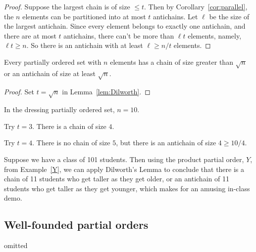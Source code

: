\begin{proof}
Suppose the largest chain is of size $\le t$.  Then by
Corollary~\ref{cor:parallel}, the $n$ elements can be partitioned into
at most $t$ antichains.  Let $\ell$ be the size of the largest
antichain.  Since every element belongs to exactly one antichain, and
there are at most $t$ antichains, there can't be more than $\ell t$
elements, namely, $\ell t \geq n$.  So there is an antichain with at
least $\ell \geq n / t$ elements.
\end{proof}

\begin{corollary}\label{cor:Dilworth}
Every partially ordered set with $n$ elements has a chain of size greater
than $\sqrt{n}$ or an antichain of size at least $\sqrt{n}$.

\begin{proof}
  Set $t = \sqrt{n}$ in Lemma~\ref{lem:Dilworth}.
\end{proof}
\end{corollary}

\begin{example}
In the dressing partially ordered set, $n = 10$.

Try $t = 3$.  There is a chain of size $4$.

Try $t = 4$.  There is no chain of size $5$, but there is an antichain of
size $4 \geq 10 / 4$.
\end{example}

\begin{example}
Suppose we have a class of 101 students.  Then using the product partial
order, $Y$, from Example~\ref{Y}, we can apply Dilworth's Lemma to
conclude that there is a chain of 11 students who get taller as they get
older, or an antichain of 11 students who get taller as they get younger,
which makes for an amusing in-class demo.
\end{example}

\begin{problems}
\practiceproblems
{}
{}

\classproblems
{}

\homeworkproblems
{}
\end{problems}

\begin{staffnotes}
\chapter*{Well-founded partial orders}
omitted
\end{staffnotes}
\endinput
